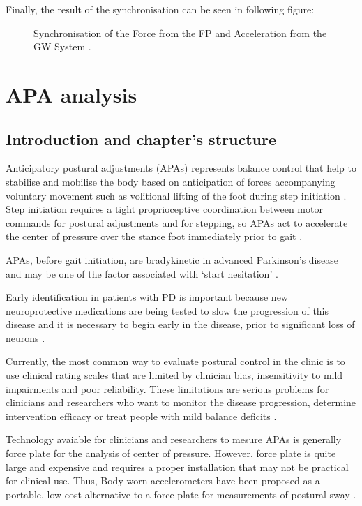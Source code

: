 Finally, the result of the synchronisation can be seen in following figure:

\begin{figure}[H]
	\centering
	\caption{Synchronisation of the Force from the FP and Acceleration from the GW System .}
	\label{fig:sinchronisedSignals}
\end{figure}


\section{APA analysis}
\subsection{Introduction and chapter's structure}

Anticipatory postural adjustments (APAs)  represents balance control that help to stabilise and mobilise the body based on anticipation of forces accompanying voluntary movement such as volitional lifting of the foot during step initiation \cite{Mancini2010} . Step initiation requires a tight proprioceptive coordination between motor commands for postural adjustments and for stepping, so APAs act to accelerate the center of pressure over the stance foot immediately prior to gait \cite{Mancini2009} .

APAs, before gait initiation, are bradykinetic in advanced Parkinson’s disease and may be one of the factor associated with ‘start hesitation’ \cite{Mancini2009} .

Early identification in patients with PD is important because new neuroprotective medications are being tested to slow the progression of this disease and it is necessary to begin early in the disease, prior to significant loss of neurons \cite{Mancini2012} . 

Currently, the most common way to evaluate postural control in the clinic is to use clinical rating scales that are limited by clinician bias, insensitivity to mild impairments and poor reliability. These limitations are serious problems for clinicians and researchers who want to monitor the disease progression, determine intervention efficacy or treat people with mild balance deficits \cite{Mancini2012} .

Technology avaiable for clinicians and researchers to mesure APAs is generally force plate for the analysis of center of pressure. However, force plate is quite large and expensive and requires a proper installation that may not be practical for clinical use. Thus, Body-worn accelerometers have been proposed as a portable, low-cost alternative to a force plate for measurements of postural sway\cite{Mancini2012} .
 
